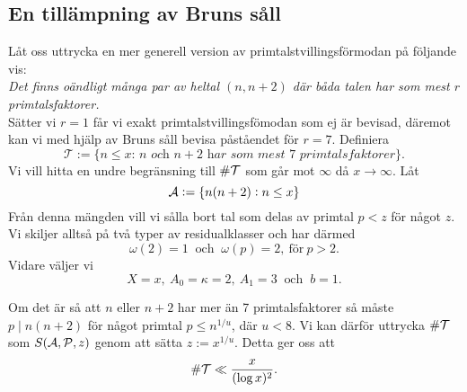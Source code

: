 

\subsection{En tillämpning av Bruns såll}
Låt oss uttrycka en mer generell version av primtalstvillingsförmodan på följande vis:\\
\textit{Det finns oändligt många par av heltal $(n, n+2)$ där båda talen har som mest $r$ primtalsfaktorer.}\\
Sätter vi $r=1$ får vi exakt primtalstvillingsfömodan som ej är bevisad, däremot kan vi med hjälp av Bruns såll bevisa påståendet för $r=7$. Definiera
\begin{equation*}
    \mathcal{T} := \{\textit{$n\leq x$: $n$ och $n+2$ har som mest $7$ primtalsfaktorer}\}.
\end{equation*}
Vi vill hitta en undre begränsning till $\card{\mathcal{T}}$ som går mot $\infty$ då $x\to\infty$. Låt
\begin{equation*}
    \A := \{n(n+2): n\leq x\}
\end{equation*}
Från denna mängden vill vi sålla bort tal som delas av primtal $p<z$ för något $z$. Vi skiljer alltså på två typer av residualklasser och har därmed
\begin{equation*}
    \omega(2)=1\ \text{ och }\ \omega(p)=2,\ \text{för}\ p>2.
\end{equation*}
Vidare väljer vi
\begin{equation*}
    X=x,\ 
    A_0=\kappa=2,\ 
    A_1=3\
    \text{ och }\
    b=1.
\end{equation*}


Om det är så att $n$ eller $n+2$ har mer än 7 primtalsfaktorer så måste $p\mid n(n+2)$ för något primtal $p\leq n^{1/u}$, där $u<8$. Vi kan därför uttrycka $\card\mathcal{T}$ som $\S{A}{P}{z}$ genom att sätta $z := x^{1/u}$. Detta ger oss att
\begin{equation*}
    \card\mathcal{T} \ll \frac{x}{(\log x)^2}.
\end{equation*}
